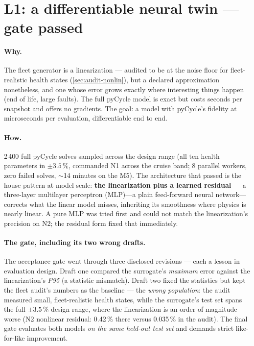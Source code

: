 \section{L1: a differentiable neural twin --- gate passed}
\label{sec:f8-l1}

\paragraph{Why.} The fleet generator is a linearization --- audited to be at the noise
floor for fleet-realistic health states (\cref{sec:audit-nonlin}), but a declared
approximation nonetheless, and one whose error grows exactly where interesting things
happen (end of life, large faults). The full pyCycle model is exact but costs seconds per
snapshot and offers no gradients. The goal: a model with pyCycle's fidelity at
microseconds per evaluation, differentiable end to end.

\paragraph{How.} 2\,400 full pyCycle solves sampled across the design range (all ten
health parameters in $\pm3.5\,\%$, commanded N1 across the cruise band; 8 parallel
workers, zero failed solves, $\sim$14 minutes on the M5). The architecture that passed is
the house pattern at model scale: \textbf{the linearization plus a learned residual} --- a
three-layer multilayer perceptron (MLP)---a plain feed-forward neural network---corrects
what the linear model misses, inheriting its smoothness where
physics is nearly linear. A pure MLP was tried first and could not match the
linearization's precision on N2; the residual form fixed that immediately.

\paragraph{The gate, including its two wrong drafts.} The acceptance gate went through
three disclosed revisions --- each a lesson in evaluation design. Draft one compared the
surrogate's \emph{maximum} error against the linearization's \emph{P95} (a statistic
mismatch). Draft two fixed the statistics but kept the fleet audit's numbers as the
baseline --- the \emph{wrong population}: the audit measured small, fleet-realistic health
states, while the surrogate's test set spans the full $\pm3.5\,\%$ design range, where the
linearization is an order of magnitude worse (N2 nonlinear residual: 0.42\,\% there versus
0.035\,\% in the audit). The final gate evaluates both models \emph{on the same held-out
test set} and demands strict like-for-like improvement.

